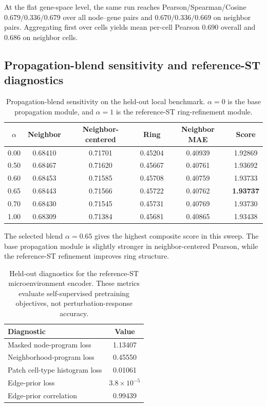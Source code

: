 \documentclass[sigconf,anonymous,review]{acmart}
\begin{document}
At the flat gene-space level, the same run reaches Pearson/Spearman/Cosine $0.679/0.336/0.679$ over all node--gene pairs and $0.670/0.336/0.669$ on neighbor pairs. Aggregating first over cells yields mean per-cell Pearson $0.690$ overall and $0.686$ on neighbor cells.

\subsection{Propagation-blend sensitivity and reference-ST diagnostics}
\label{app:blend_and_reference_diagnostics}

\begin{table}[t]
\centering
\caption{Propagation-blend sensitivity on the held-out local benchmark. $\alpha=0$ is the base propagation module, and $\alpha=1$ is the reference-ST ring-refinement module.}
\label{tab:app_blend_sweep}
\small
\setlength{\tabcolsep}{5pt}
\renewcommand{\arraystretch}{1.10}
\begin{tabular}{cccccc}
\toprule
$\alpha$ & Neighbor & Neighbor-centered & Ring & Neighbor MAE & Score \\
\midrule
0.00 & 0.68410 & 0.71701 & 0.45204 & 0.40939 & 1.92869 \\
0.50 & 0.68467 & 0.71620 & 0.45667 & 0.40761 & 1.93692 \\
0.60 & 0.68453 & 0.71585 & 0.45708 & 0.40759 & 1.93733 \\
0.65 & 0.68443 & 0.71566 & 0.45722 & 0.40762 & \textbf{1.93737} \\
0.70 & 0.68430 & 0.71545 & 0.45731 & 0.40769 & 1.93730 \\
1.00 & 0.68309 & 0.71384 & 0.45681 & 0.40865 & 1.93438 \\
\bottomrule
\end{tabular}
\end{table}

The selected blend $\alpha=0.65$ gives the highest composite score in this sweep. The base propagation module is slightly stronger in neighbor-centered Pearson, while the reference-ST refinement improves ring structure.

\begin{table}[t]
\centering
\caption{Held-out diagnostics for the reference-ST microenvironment encoder. These metrics evaluate self-supervised pretraining objectives, not perturbation-response accuracy.}
\label{tab:app_organ_prior}
\small
\setlength{\tabcolsep}{8pt}
\renewcommand{\arraystretch}{1.12}
\begin{tabular}{lc}
\toprule
Diagnostic & Value \\
\midrule
Masked node-program loss & 1.13407 \\
Neighborhood-program loss & 0.45550 \\
Patch cell-type histogram loss & 0.01061 \\
Edge-prior loss & $3.8\times10^{-5}$ \\
Edge-prior correlation & 0.99439 \\
\bottomrule
\end{tabular}
\end{table}
\end{document}
